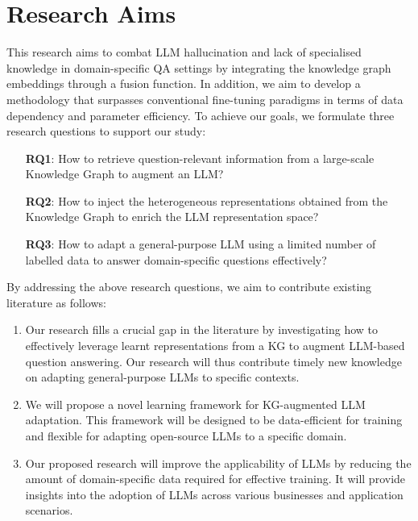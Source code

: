 \section*{Research Aims}

This research aims to combat LLM hallucination and lack of specialised knowledge in domain-specific QA settings by integrating the knowledge graph embeddings through a fusion function. 
In addition, we aim to develop a methodology that surpasses conventional fine-tuning paradigms in terms of data dependency and parameter efficiency. 
To achieve our goals, we formulate three research questions to support our study: 
\vspace{-0.5cm}
\begin{itemize}
    \item[\textbf{RQ1}:] How to retrieve question-relevant information from a large-scale Knowledge Graph to augment an LLM?
    \item[\textbf{RQ2}:] How to inject the heterogeneous representations obtained from the Knowledge Graph to enrich the LLM representation space?
    \item[\textbf{RQ3}:] How to adapt a general-purpose LLM using a limited number of labelled data to answer domain-specific questions effectively?
\end{itemize}
\vspace{-0.3cm}

By addressing the above research questions, we aim to contribute existing literature as follows:\vspace{-0.3cm}
\begin{enumerate}
    \item Our research fills a crucial gap in the literature by investigating how to effectively leverage learnt representations from a KG to augment LLM-based question answering. Our research will thus contribute timely new knowledge on adapting general-purpose LLMs to specific contexts.

    \item We will propose a novel learning framework for KG-augmented LLM adaptation. This framework will be designed to be data-efficient for training and flexible for adapting open-source LLMs to a specific domain.

    \item Our proposed research will improve the applicability of LLMs by reducing the amount of domain-specific data required for effective training. It will provide insights into the adoption of LLMs across various businesses and application scenarios.
    
\end{enumerate}

